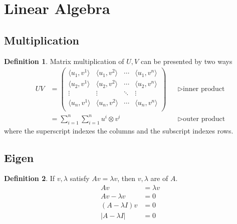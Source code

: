 \documentclass[a4paper]{article}
\theoremstyle{definition}
\newtheorem{definition}{Definition}
\theoremstyle{plain}
\begin{document}
\newpage
\section{Linear Algebra}
\subsection{Multiplication}
\begin{definition}
Matrix multiplication of $U,V$ can be presented by two ways
\begin{align*}UV&=
    \begin{pmatrix}
        \langle u_1,v^1\rangle & \langle u_1,v^2\rangle & \cdots &\langle u_1,v^n\rangle \\
        \langle u_2,v^1\rangle & \langle u_2,v^2\rangle & \cdots &\langle u_2,v^n\rangle \\
        \vdots & \vdots & \ddots &\vdots \\
        \langle u_n,v^1\rangle & \langle u_n,v^2\rangle & \cdots &\langle u_n,v^n\rangle \\
    \end{pmatrix}&&\triangleright\text{inner product}\\
    &=\sum^n_{i=1}\sum^n_{i=1}u^i\otimes v^i&&\triangleright\text{outer product}
\end{align*}
where the superscript indexes the columns and the subscript indexes rows.
\end{definition}
\subsection{Eigen}
\begin{definition}
If $v,\lambda$ satisfy $Av=\lambda v$, then $v,\lambda$ are  of $A$.
\begin{align*}
    Av&=\lambda v\\
    Av-\lambda v&=0\\
    (A-\lambda I)v&=0\\
    |A-\lambda I|&=0
\end{align*}
\end{definition}
\end{document}
